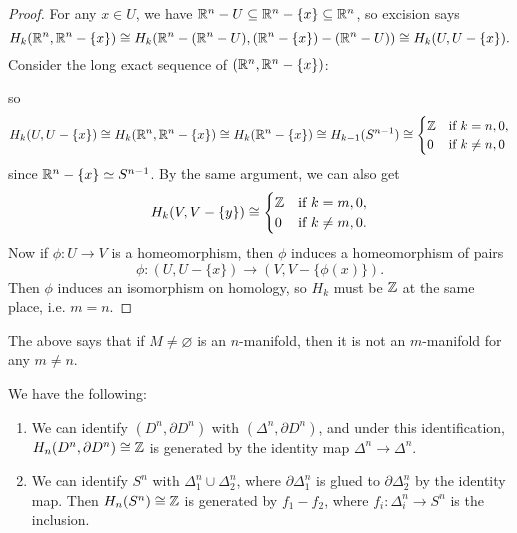 \begin{proof}
  For any $x \in U$, we have
  $\mathbb{R}^n - U \subseteq \mathbb{R}^n - \{x\} \subseteq \mathbb{R}^n$, so
  excision says
  \[
    H_k(\mathbb{R}^n, \mathbb{R}^n - \{x\}) \cong
    H_k(\mathbb{R}^n - (\mathbb{R}^n - U), (\mathbb{R}^n - \{x\}) - (\mathbb{R}^n - U))
    \cong H_k(U, U - \{x\}).
  \]
  Consider the long exact sequence of $(\mathbb{R}^n, \mathbb{R}^n - \{x\})$:
  \begin{center}
  \end{center}
  so
  \[
    H_k(U, U - \{x\})
    \cong H_k(\mathbb{R}^n, \mathbb{R}^n - \{x\})
    \cong H_k(\mathbb{R}^n - \{x\})
    \cong H_{k - 1}(S^{n - 1})
    \cong
    \begin{cases}
      \mathbb{Z} & \text{if } k = n, 0, \\
      0 & \text{if } k \ne n, 0
    \end{cases}
  \]
  since $\mathbb{R}^n - \{x\} \simeq S^{n - 1}$. By the
  same argument, we can also get
  \[
    H_k(V, V - \{y\}) \cong
    \begin{cases}
      \mathbb{Z} & \text{if } k = m, 0, \\
      0 & \text{if } k \ne m, 0.
    \end{cases}
  \]
  Now if $\phi : U \to V$ is a homeomorphism,
  then $\phi$ induces a homeomorphism of pairs
  \[
    \phi : (U, U - \{x\}) \to (V, V - \{\phi(x)\}).
  \]
  Then $\phi$ induces an isomorphism on homology,
  so $H_k$ must be $\mathbb{Z}$ at the
  same place, i.e. $m = n$.
\end{proof}

\begin{remark}
  The above says that if $M \ne \varnothing$
  is an $n$-manifold, then it is not an $m$-manifold
  for any $m \ne n$.
\end{remark}

\begin{prop}
  We have the following:
  \begin{enumerate}
    \item We can identify $(D^n, \partial D^n)$
      with $(\Delta^n, \partial D^n)$, and under this
      identification, $H_n(D^n, \partial D^n) \cong \mathbb{Z}$
      is generated by the identity map
      $\Delta^n \to \Delta^n$.
    \item We can identify $S^n$ with
      $\Delta_1^n \cup \Delta_2^n$, where
      $\partial \Delta_1^n$ is glued to
      $\partial \Delta_2^n$ by the identity map.
      Then $H_n(S^n) \cong \mathbb{Z}$ is generated by
      $f_1 - f_2$, where $f_i : \Delta_i^n \to S^n$
      is the inclusion.
  \end{enumerate}
\end{prop}

